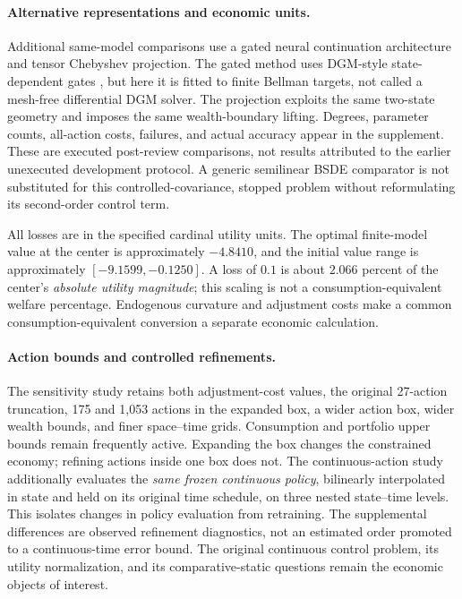\paragraph*{Alternative representations and economic units.}
Additional same-model comparisons use a gated neural continuation architecture and tensor Chebyshev projection. The gated method uses DGM-style state-dependent gates \citep{sirignano2018}, but here it is fitted to finite Bellman targets, not called a mesh-free differential DGM solver. The projection exploits the same two-state geometry and imposes the same wealth-boundary lifting. Degrees, parameter counts, all-action costs, failures, and actual accuracy appear in the supplement. These are executed post-review comparisons, not results attributed to the earlier unexecuted development protocol. A generic semilinear BSDE comparator is not substituted for this controlled-covariance, stopped problem without reformulating its second-order control term.

All losses are in the specified cardinal utility units. The optimal finite-model value at the center is approximately $-4.8410$, and the initial value range is approximately $[-9.1599,-0.1250]$. A loss of $0.1$ is about $2.066$ percent of the center's \emph{absolute utility magnitude}; this scaling is not a consumption-equivalent welfare percentage. Endogenous curvature and adjustment costs make a common consumption-equivalent conversion a separate economic calculation.

\paragraph*{Action bounds and controlled refinements.}
The sensitivity study retains both adjustment-cost values, the original 27-action truncation, 175 and 1,053 actions in the expanded box, a wider action box, wider wealth bounds, and finer space--time grids. Consumption and portfolio upper bounds remain frequently active. Expanding the box changes the constrained economy; refining actions inside one box does not. The continuous-action study additionally evaluates the \emph{same frozen continuous policy}, bilinearly interpolated in state and held on its original time schedule, on three nested state--time levels. This isolates changes in policy evaluation from retraining. The supplemental differences are observed refinement diagnostics, not an estimated order promoted to a continuous-time error bound. The original continuous control problem, its utility normalization, and its comparative-static questions remain the economic objects of interest.




